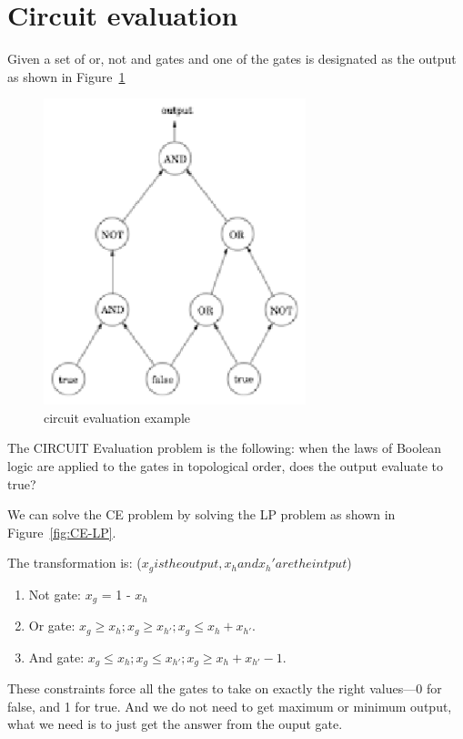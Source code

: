\documentclass[usletter]{article}
\begin{document}
\section{Circuit evaluation}
Given a set of or, not and gates and one of the gates is designated as the output as shown in Figure~\ref{fig:circuit-evaluation}

\begin{figure}[bht]
\begin{center}
     \includegraphics[width=3.0in]{figures/circuit-evaluation}
\caption{\label{fig:circuit-evaluation}circuit evaluation example}
\end{center}
\end{figure}

The CIRCUIT Evaluation problem is the following: when the laws of Boolean logic are applied to the gates in topological order, does the output evaluate to true?

We can solve the CE problem by solving the LP problem as shown in Figure~\ref{fig:CE-LP}.

The transformation is: ($x_g is the output, x_h and x_h' are the intput$)
\begin{enumerate} 
	\item 	Not gate: $x_{g}$ = 1 - $x_{h}$ 
	\item Or gate: $x_{g} \ge x_{h}; x_{g} \ge x_{h'}; x_{g} \le x_{h} + x_{h'}$.
	\item And gate: $x_{g} \le x_{h}; x_{g} \le x_{h'}; x_{g} \ge x_{h} + x_{h'} - 1$.
\end{enumerate}

These constraints force all the gates to take on exactly the right values—0 for false, and 1 for true. And we do not need to get maximum or minimum output, what we need is to just get the answer from the ouput gate.
\end{document}
